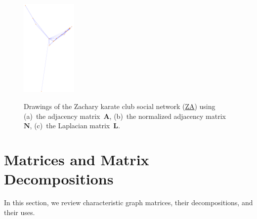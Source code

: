 \documentclass{article}
\newcommand{\wFour}{0.24\textwidth}
\begin{document}
\begin{figure}
{    \includegraphics[width=\wFour]{plot/map.ax.lap.ucidata-zachary}}
  \caption{ Drawings of the Zachary karate club social network
    (\href{http://konect.uni-koblenz.de/networks/ucidata-zachary}{\textsf{ZA}})
    using (a)~the adjacency matrix~$\mathbf A$, (b)~the normalized
    adjacency matrix~$\mathbf N$, (c)~the Laplacian matrix~$\mathbf L$.
    \label{fig:map.ax}
  }
\end{figure}

\section{Matrices and Matrix Decompositions}
\label{sec:matrix}
In this section, we review characteristic graph matrices, their
decompositions, and their uses. 
\end{document}

